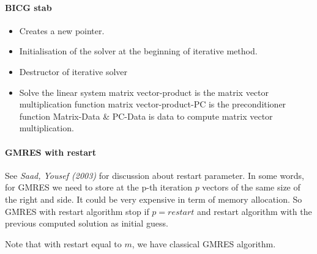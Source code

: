\paragraph{BICG stab}
\begin{itemize}
\item {}
  \sshortdescribe Creates a new  pointer.  
\item {}
  \sshortdescribe Initialisation of the solver at the beginning of iterative method.  
\item {}
  \sshortdescribe Destructor of iterative solver  
\item {}
  \sshortdescribe Solve the linear system matrix vector-product is the matrix vector multiplication function matrix vector-product-PC is the preconditioner function Matrix-Data \& PC-Data is data to compute matrix vector multiplication.  
\end{itemize}

\paragraph{GMRES with restart}
See {\em Saad, Yousef (2003)} for discussion about restart parameter. In some
words, for GMRES we need to store at the p-th iteration $p$ vectors of the same size of the right
and side. It could be very expensive in term of memory allocation. So GMRES
with restart algorithm stop if $p=restart$ and restart algorithm with the
previous computed solution as initial guess.

Note that with restart equal to $m$, we have classical GMRES algorithm.

